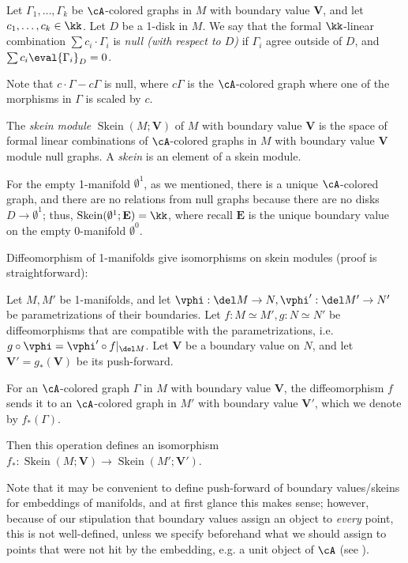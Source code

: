 \documentclass[12pt]{article}
\newcommand{\empt}[1]{{\emptyset^{#1}}}
\newcommand{\VV}{{\mathbf{V}}}
\newcommand{\EE}{{\mathbf{E}}}
\DeclareMathOperator{\Skein}{Skein}
\begin{document}
\begin{definition}
\label{d:null-graph}
Let $\Gamma_1,\ldots,\Gamma_k$ be $\cA$-colored graphs in $M$
with boundary value $\VV$,
and let $c_1,\ldots,c_k \in \kk$.
Let $D$ be a 1-disk in $M$.
We say that the formal $\kk$-linear combination
$\sum c_i \cdot \Gamma_i$ is
\emph{null (with respect to $D$)}
if $\Gamma_i$ agree outside of $D$,
and $\sum c_i \eval{\Gamma_i}_D = 0$.
\end{definition}

Note that $c \cdot \Gamma - c\Gamma$ is null,
where $c\Gamma$ is the $\cA$-colored graph
where one of the morphisms in $\Gamma$ is scaled by $c$.

\begin{definition}
\label{d:skein}
The \emph{skein module} $\Skein(M;\VV)$
of $M$ with boundary value $\VV$
is the space of formal linear combinations of
$\cA$-colored graphs in $M$ with boundary value $\VV$
module null graphs.
A \emph{skein} is an element of a skein module.
\end{definition}


For the empty 1-manifold $\empt{1}$,
as we mentioned, there is a unique $\cA$-colored graph,
and there are no relations from null graphs
because there are no disks $D \to \empt{1}$;
thus, $\Skein(\empt{1};\EE) = \kk$,
where recall $\EE$ is the unique boundary value on
the empty 0-manifold $\empt{0}$.

Diffeomorphism of 1-manifolds give isomorphisms
on skein modules (proof is straightforward):

\begin{proposition}
\label{p:diffeo}
Let $M, M'$ be 1-manifolds,
and let $\vphi: \del M \to N, \vphi': \del M' \to N'$
be parametrizations of their boundaries.
Let $f: M \simeq M', g: N \simeq N'$ be diffeomorphisms
that are compatible with the parametrizations,
i.e. $g \circ \vphi = \vphi' \circ f|_{\del M}$.
Let $\VV$ be a boundary value on $N$,
and let $\VV' = g_*(\VV)$ be its push-forward.

For an $\cA$-colored graph $\Gamma$ in $M$
with boundary value $\VV$,
the diffeomorphism $f$ sends it to
an $\cA$-colored graph in $M'$
with boundary value $\VV'$,
which we denote by $f_*(\Gamma)$.

Then this operation defines an isomorphism
$f_*: \Skein(M;\VV) \to \Skein(M';\VV')$.
\end{proposition}

Note that it may be convenient to define push-forward
of boundary values/skeins for embeddings of manifolds,
and at first glance this makes sense;
however, because of our stipulation that
boundary values assign an object to \emph{every} point,
this is not well-defined,
unless we specify beforehand
what we should assign to points that were not hit
by the embedding, e.g. a unit object of $\cA$
(see ).
\end{document}
